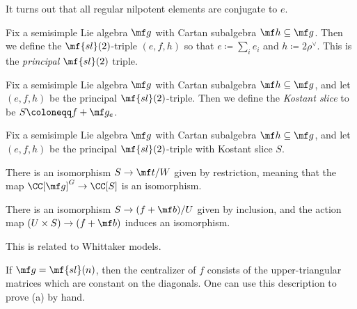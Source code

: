 \documentclass[../notes.tex]{subfiles}
\begin{document}
\begin{remark}
	It turns out that all regular nilpotent elements are conjugate to $e$.
\end{remark}
\begin{definition}
	Fix a semisimple Lie algebra $\mf g$ with Cartan subalgebra $\mf h\subseteq\mf g$. Then we define the $\mf{sl}(2)$-triple $(e,f,h)$ so that $e\coloneqq\sum_ie_i$ and $h\coloneqq2\rho^\lor$. This is the \textit{principal $\mf{sl}(2)$} triple.
\end{definition}
\begin{definition}
	Fix a semisimple Lie algebra $\mf g$ with Cartan subalgebra $\mf h\subseteq\mf g$, and let $(e,f,h)$ be the principal $\mf{sl}(2)$-triple. Then we define the \textit{Kostant slice} to be $S\coloneqq f+\mf g_e$.
\end{definition}
\begin{theorem}
	Fix a semisimple Lie algebra $\mf g$ with Cartan subalgebra $\mf h\subseteq\mf g$, and let $(e,f,h)$ be the principal $\mf{sl}(2)$-triple with Kostant slice $S$.
	\begin{listalph}
		\item There is an isomorphism $S\to\mf t/W$ given by restriction, meaning that the map $\CC[\mf g]^G\to\CC[S]$ is an isomorphism.
		\item There is an isomorphism $S\to(f+\mf b)/U$ given by inclusion, and the action map $(U\times S)\to(f+\mf b)$ induces an isomorphism.
	\end{listalph}
\end{theorem}
\begin{remark}
	This is related to Whittaker models.
\end{remark}
\begin{example}
	If $\mf g=\mf{sl}(n)$, then the centralizer of $f$ consists of the upper-triangular matrices which are constant on the diagonals. One can use this description to prove (a) by hand.
\end{example}
\end{document}
